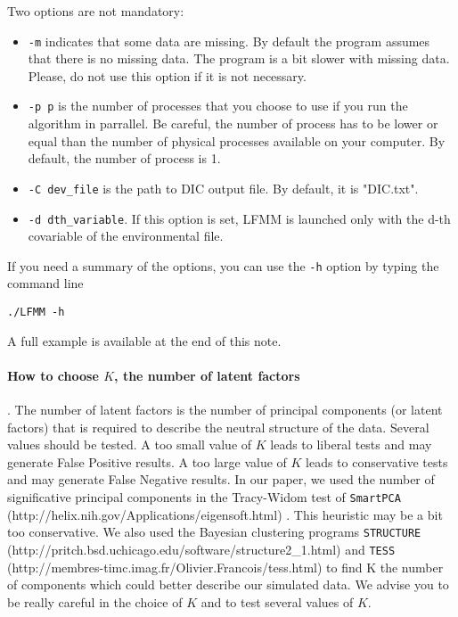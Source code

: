\documentclass[10pt,a4paper]{article}
\begin{document}
\noindent
Two options are not mandatory:
\begin{itemize}
\item \verb|-m| indicates that some data are missing. By default the program assumes that there is no 
missing data. The program is a bit slower with missing data. Please, do not use this option if it is not necessary.
\item \verb|-p p| is the number of processes that you choose to use if you run the algorithm in 
parrallel. Be careful, the number of process has to be lower or equal than the number of physical 
processes available on your computer. By default, the number of process is 1.
\item \verb|-C dev_file| is the path to DIC output file. By default, it is "DIC.txt".
\item \verb|-d dth_variable|. If this option is set, LFMM is launched only with the d-th covariable
of the environmental file.
\end{itemize}


\noindent
If you need a summary of the options, you can use the \verb|-h| option by typing the command line
\footnotesize
\begin{Verbatim}[frame=single]
./LFMM -h
\end{Verbatim}
\noindent
\normalsize

\noindent
A full example is available at the end of this note.


\paragraph{How to choose $K$, the number of latent factors}.
The number of latent factors is the number of principal components (or latent factors) that is
required to describe the neutral structure of the data. Several values should be tested.
A too small value of $K$ leads to liberal tests and may generate False Positive results.
A too large value of $K$ leads to conservative tests and may generate False Negative results.           
In our paper, we used the number of significative principal components in the
Tracy-Widom test of {\tt SmartPCA} (http://helix.nih.gov/Applications/eigensoft.html)
\cite{Patterson_2006}. This heuristic may be a bit too conservative.
We also used the Bayesian clustering programs {\tt STRUCTURE}
(http://pritch.bsd.uchicago.edu/software/structure2\_1.html) \cite{Pritchard_2000} and {\tt TESS}
(http://membres-timc.imag.fr/Olivier.Francois/tess.html) \cite{Chen_2007, Durand_2009}
to find K the number of components which could better describe our simulated data.
We advise you to be really careful in the choice of $K$ and to test several values of $K$.
\end{document}
